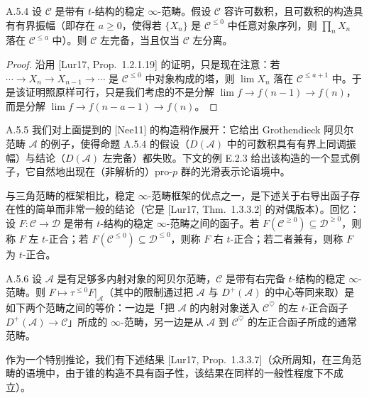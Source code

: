 \begin{prop}{A.5.4}\label{prop:a4-17-A-5-4}
设 $\mathcal C$ 是带有 $t$-结构的稳定 $\infty$-范畴。假设 $\mathcal C$ 容许可数积，且可数积的构造具有有界振幅（即存在 $a\geq0$，使得若 $\{X_n\}$ 是 $\mathcal C^{\leq0}$ 中任意对象序列，则 $\prod_n X_n$ 落在 $\mathcal C^{\leq a}$ 中）。则 $\mathcal C$ 左完备，当且仅当 $\mathcal C$ 左分离。
\end{prop}

\begin{proof}
沿用 [Lur17, Prop.~1.2.1.19] 的证明，只是现在注意：若 $\cdots\to X_n\to X_{n-1}\to\cdots$ 是 $\mathcal C^{\leq0}$ 中对象构成的塔，则 $\lim X_n$ 落在 $\mathcal C^{\leq a+1}$ 中。于是该证明照原样可行，只是我们考虑的不是分解 $\lim f\to f(n-1)\to f(n)$，而是分解 $\lim f\to f(n-a-1)\to f(n)$。
\end{proof}

\begin{rem}{A.5.5}\label{rem:a4-17-A-5-5}
我们对上面提到的 [Nee11] 的构造稍作展开：它给出 Grothendieck 阿贝尔范畴 $\mathcal A$ 的例子，使得命题 A.5.4 的假设（$D(\mathcal A)$ 中的可数积具有有界上同调振幅）与结论（$D(\mathcal A)$ 左完备）都失败。下文的例 E.2.3 给出该构造的一个显式例子，它自然地出现在（非解析的）pro-$p$ 群的光滑表示论语境中。
\end{rem}

与三角范畴的框架相比，稳定 $\infty$-范畴框架的优点之一，是下述关于右导出函子存在性的简单而非常一般的结论（它是 [Lur17, Thm.~1.3.3.2] 的对偶版本）。回忆：设 $F:\mathcal C\to\mathcal D$ 是带有 $t$-结构的稳定 $\infty$-范畴之间的函子。若 $F(\mathcal C^{\geq0})\subseteq\mathcal D^{\geq0}$，则称 $F$ 左 $t$-正合；若 $F(\mathcal C^{\leq0})\subseteq\mathcal D^{\leq0}$，则称 $F$ 右 $t$-正合；若二者兼有，则称 $F$ 为 $t$-正合。


\begin{thm}{A.5.6}\label{thm:a4-17-A-5-6}
设 $\mathcal A$ 是有足够多内射对象的阿贝尔范畴，$\mathcal C$ 是带有右完备 $t$-结构的稳定 $\infty$-范畴。则 $F\mapsto\tau^{\leq0}F|_{\mathcal A}$（其中的限制通过把 $\mathcal A$ 与 $D^+(\mathcal A)$ 的中心等同来取）是如下两个范畴之间的等价：一边是「把 $\mathcal A$ 的内射对象送入 $\mathcal C^{\heartsuit}$ 的左 $t$-正合函子 $D^+(\mathcal A)\to\mathcal C$」所成的 $\infty$-范畴，另一边是从 $\mathcal A$ 到 $\mathcal C^{\heartsuit}$ 的左正合函子所成的通常范畴。
\end{thm}

作为一个特别推论，我们有下述结果 [Lur17, Prop.~1.3.3.7]（众所周知，在三角范畴的语境中，由于锥的构造不具有函子性，该结果在同样的一般性程度下不成立）。

